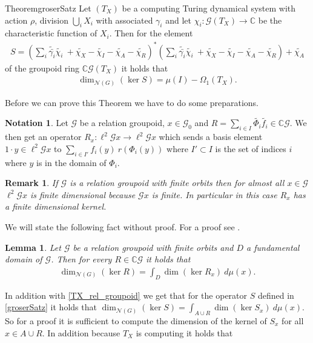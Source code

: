 \documentclass[12pt,a4paper]{scrartcl}
\theoremstyle{plain}
\newtheorem{Lemma}[Theorem]{Lemma}
\newtheorem{Remark}[Theorem]{Remark}
\theoremstyle{definition}
\newtheorem{Notation}[Theorem]{Notation}
\newcommand{\C}{\mathbb{C}} %
\newcommand{\2}{\mathbb{Z} / 2 \mathbb{Z}}
\newcommand{\G}{\mathcal{G}}
\newcommand{\1}{\bar{1}}
\newcommand{\0}{\bar{0}}
\begin{document}
\begin{restatable}{Theorem}{groserSatz} \label{groserSatz}
	Let $(T_X)$ be a computing Turing dynamical system with action $\rho$, division $\bigcup_i X_i$ with associated $\gamma_i$ and let $\chi_i \colon\G(T_X) \to \C$ be the characteristic function of $X_i$. Then for the element
	\begin{align*}
		S = (\sum_{i} \widetilde{\bar{\gamma_i}} \widetilde{\chi_i} \ + \widetilde{\chi_X} - \widetilde{\chi_I} - \widetilde{\chi_A} - \widetilde{\chi_R})^*(\sum_{i} \widetilde{\bar{\gamma_i}} \widetilde{\chi_i} \ + \widetilde{\chi_X} - \widetilde{\chi_I} - \widetilde{\chi_A} - \widetilde{\chi_R}) + \widetilde{\chi_A}
	\end{align*}
	of the groupoid ring $\C \G(T_X)$ it holds that
	\begin{align*}
		\dim_{\mathcal{N}(G)}(\ker S) = \mu(I) - \Omega_1(T_X).
	\end{align*}
\end{restatable}
Before we can prove this Theorem we have to do some preparations. 
\begin{Notation}
	Let $\G$ be a relation groupoid, $x \in \G_0$ and $R = \sum_{i \in I} \widetilde{\Phi_i} \widetilde{f_i} \in \C\G$. We then get an operator $R_x\colon\ell^2\G x \to \ell^2\G x$ which sends a basis element $1 \cdot y \in \ell^2\G x$ to $\sum_{i \in I'} f_i(y) ~ r(\Phi_i(y)) $ where $I' \subset I$ is the set of indices $i$ where $y$ is in the domain of $\Phi_i$. 
\end{Notation}
\begin{Remark}
	If $\G$ is a relation groupoid with finite orbits then for almost all $x \in \G$ $\ell^2\G x$ is finite dimensional because $\G x$ is finite. In particular in this case $R_x$ has a finite dimensional kernel.
\end{Remark}
We will state the following fact without proof. For a proof see \cite{GRAB}.
\begin{Lemma} \label{T_to_Tx}
	Let $\G$ be a relation groupoid with finite orbits and $D$ a fundamental domain of $\G$. Then for every $R \in \C \G$ it holds that
	\begin{align*}
		\dim_{\mathcal{N}(G)}(\ker R) = \int_D \dim (\ker R_x) \ d \mu (x).
	\end{align*} 
\end{Lemma}
In addition with \ref{TX_rel_groupoid} we get that for the operator $S$ defined in \ref{groserSatz} it holds that $\dim_{\mathcal{N}(G)}(\ker S) = \int_{A \cup R} \dim (\ker S_x) \ d \mu (x)$. So for a proof it is sufficient to compute the dimension of the kernel of $S_x$ for all $x \in A \cup R$. In addition because $T_X$ is computing it holds that
\end{document}
